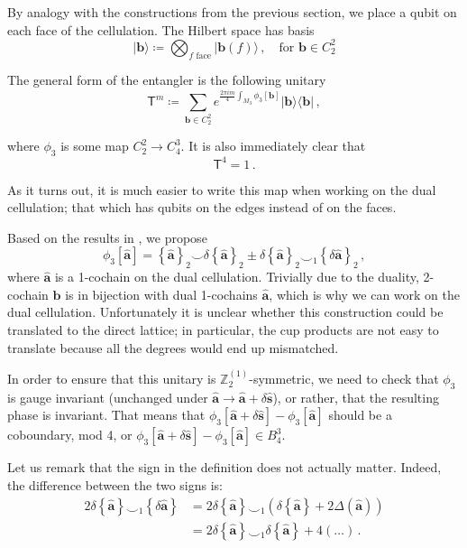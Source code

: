 \documentclass[aps,twocolumn,prx,floatfix,preprintnumbers, nofootinbib,10pt]{revtex4-2}
\numberwithin{equation}{section}
\theoremstyle{definition}
\theoremstyle{remark}
\theoremstyle{claim}
\newcommand{\be}{\begin{equation}}
\newcommand{\ee}{\end{equation}}
\newcommand{\lbbb}{\left\{}
\newcommand{\rbbb}{\right\}}
\newcommand{\Z}{{\mathbb Z}}
\newcommand{\lrb}[1]{\lbbb #1 \rbbb}
\def\bra#1{{\langle{#1}|}}
\def\ket#1{{|{#1}\rangle}}
\renewcommand{\sf}[1]{\mathsf{#1}}
\begin{document}
By analogy with the constructions from the previous section, we place a qubit on each face of the cellulation. The Hilbert space has basis
\be
\ket{\bm{b}} \coloneqq \bigotimes_{f \text{ face}} \ket{\bm{b}(f)} \,, \quad \text{for } \bm{b} \in C^2_2
\ee

The general form of the entangler is the following unitary
\be
\sf{T}^m \coloneqq \sum_{\bm{b} \in C^2_2} e^{\frac{2 \pi i m}{4} \int_{M_3} \phi_3[\bm{b}]} \ket{\bm{b}} \bra{\bm{b}} \,,
\ee

where $\phi_3$ is some map $C^2_2 \rightarrow C^3_4$. It is also immediately clear that
\be\label{eq:T4action}
\sf{T}^4 = 1 \,.
\ee

As it turns out, it is much easier to write this map when working on the dual cellulation; that which has qubits on the edges instead of on the faces.

Based on the results in \cite{Tsui:2019ykk}, we propose
\be\label{eq:phi3}
\phi_3[\bm{\hat{a}}] = \lbbb \bm{\hat{a}} \rbbb_2 \smile \delta \lbbb \bm{\hat{a}} \rbbb_2 \pm \delta \lbbb \bm{\hat{a}} \rbbb_2 \smile_1 \lbbb \delta \bm{\hat{a}} \rbbb_2 \,,
\ee
where $\bm{\hat{a}}$ is a 1-cochain on the dual cellulation. Trivially due to the duality, 2-cochain $\bm{b}$ is in bijection with dual 1-cochains $\bm{\hat{a}}$, which is why we can work on the dual cellulation. Unfortunately it is unclear whether this construction could be translated to the direct lattice; in particular, the cup products are not easy to translate because all the degrees would end up mismatched.

In order to ensure that this unitary is $\Z_2^{(1)}$-symmetric, we need to check that $\phi_3$ is gauge invariant (unchanged under $\bm{\hat{a}} \rightarrow \bm{\hat{a}} + \delta \bm{\hat{s}}$), or rather, that the resulting phase is invariant. That means that $\phi_3[\bm{\hat{a}} + \delta \bm{\hat{s}}] - \phi_3 [\bm{\hat{a}}]$ should be a coboundary, mod 4, or $\phi_3[\bm{\hat{a}} + \delta \bm{\hat{s}}] - \phi_3 [\bm{\hat{a}}] \in B^3_4$.

Let us remark that the sign in the definition does not actually matter. Indeed, the difference between the two signs is:
\begin{align}
 2 \delta \lrb{\bm{\hat{a}}} \smile_1 \lrb{\delta \bm{\hat{a}}} &= 2 \delta \lrb{\bm{\hat{a}}} \smile_1 (\delta \lrb{\bm{\hat{a}}} + 2 \Delta(\bm{\hat{a}})) \nonumber \\
 &= 2 \delta \lrb{\bm{\hat{a}}} \smile_1 \delta \lrb{\bm{\hat{a}}} + 4 (\dots) \,.
\end{align}
\end{document}
